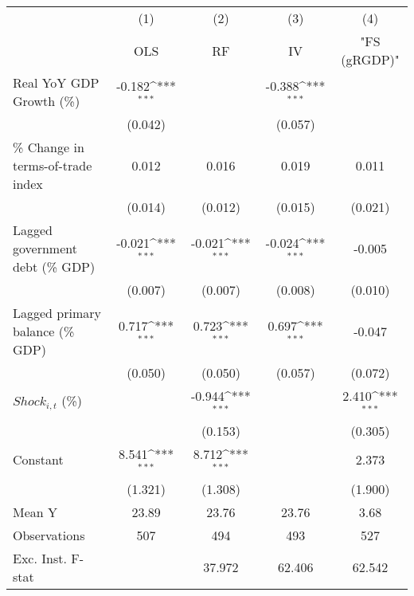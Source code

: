 {
\def\sym#1{\ifmmode^{#1}\else\(^{#1}\)\fi}
\begin{tabular}{l*{4}{c}}
\toprule
                    &\multicolumn{1}{c}{(1)}&\multicolumn{1}{c}{(2)}&\multicolumn{1}{c}{(3)}&\multicolumn{1}{c}{(4)}\\
                    &\multicolumn{1}{c}{OLS}&\multicolumn{1}{c}{RF}&\multicolumn{1}{c}{IV}&\multicolumn{1}{c}{ "FS (gRGDP)" }\\
\midrule
Real YoY GDP Growth (\%)&      -0.182\sym{***}&                     &      -0.388\sym{***}&                     \\
                    &     (0.042)         &                     &     (0.057)         &                     \\
\addlinespace
\% Change in terms-of-trade index&       0.012         &       0.016         &       0.019         &       0.011         \\
                    &     (0.014)         &     (0.012)         &     (0.015)         &     (0.021)         \\
\addlinespace
Lagged government debt (\% GDP)&      -0.021\sym{***}&      -0.021\sym{***}&      -0.024\sym{***}&      -0.005         \\
                    &     (0.007)         &     (0.007)         &     (0.008)         &     (0.010)         \\
\addlinespace
Lagged primary balance (\% GDP)&       0.717\sym{***}&       0.723\sym{***}&       0.697\sym{***}&      -0.047         \\
                    &     (0.050)         &     (0.050)         &     (0.057)         &     (0.072)         \\
\addlinespace
$ Shock_{i,t}$ (\%) &                     &      -0.944\sym{***}&                     &       2.410\sym{***}\\
                    &                     &     (0.153)         &                     &     (0.305)         \\
\addlinespace
Constant            &       8.541\sym{***}&       8.712\sym{***}&                     &       2.373         \\
                    &     (1.321)         &     (1.308)         &                     &     (1.900)         \\
\midrule
Mean Y              &       23.89         &       23.76         &       23.76         &        3.68         \\
Observations        &         507         &         494         &         493         &         527         \\
Exc. Inst. F-stat   &                     &      37.972         &      62.406         &      62.542         \\
\bottomrule
\end{tabular}
}
